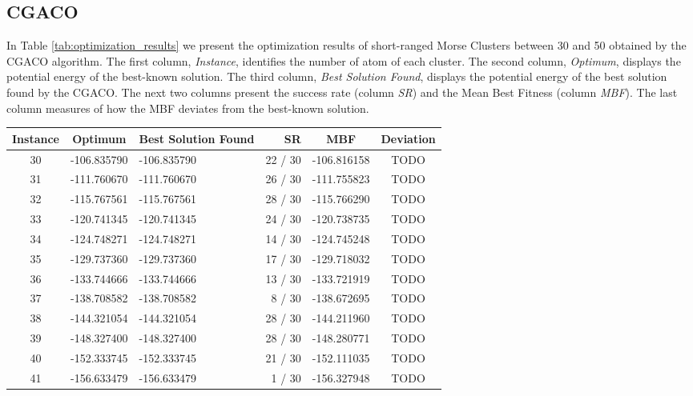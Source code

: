 	\subsection{CGACO}
	In Table \ref{tab:optimization_results} we present the optimization results of short-ranged Morse Clusters between 30 and 50 obtained by the CGACO algorithm. The first column, \emph{Instance}, identifies the number of atom of each cluster. The second column, \emph{Optimum}, displays the potential energy of the best-known solution. The third column, \emph{Best Solution Found}, displays the potential energy of the best solution found by the CGACO. The next two columns present the success rate (column \emph{SR}) and the Mean Best Fitness (column \emph{MBF}). The last column measures of how the MBF deviates from the best-known solution.
	\begin{table}[!htbp]
		\begin{center}
			\begin{tabular}{| c | c | p{3cm} | r | c | c |}
				\hline
				\textbf{Instance} & \textbf{Optimum} & \textbf{Best Solution Found} & \textbf{SR} & \textbf{MBF} & \textbf{Deviation}\\ \hline
				30 & -106.835790 & -106.835790 & 22 / 30 & -106.816158 & TODO \\ \hline
				31 & -111.760670 & -111.760670 & 26 / 30 & -111.755823 & TODO \\ \hline
				32 & -115.767561 & -115.767561 & 28 / 30 & -115.766290 & TODO \\ \hline
				33 & -120.741345 & -120.741345 & 24 / 30 & -120.738735 & TODO \\ \hline
				34 & -124.748271 & -124.748271 & 14 / 30 & -124.745248 & TODO \\ \hline
				35 & -129.737360 & -129.737360 & 17 / 30 & -129.718032 & TODO \\ \hline
				36 & -133.744666 & -133.744666 & 13 / 30 & -133.721919 & TODO \\ \hline
				37 & -138.708582 & -138.708582 & 8 / 30 & -138.672695 & TODO \\ \hline
				38 & -144.321054 & -144.321054 & 28 / 30 & -144.211960 & TODO \\ \hline
				39 & -148.327400 & -148.327400 & 28 / 30 & -148.280771 & TODO \\ \hline
				40 & -152.333745 & -152.333745 & 21 / 30 & -152.111035 & TODO \\ \hline
				41 & -156.633479 & -156.633479 & 1 / 30 & -156.327948 & TODO \\ \hline

\end{tabular}
\end{center}
\end{table}
